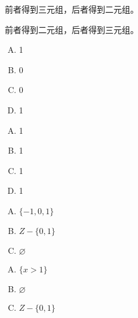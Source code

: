 {{        %
        \begin{practices}
            前者得到三元组，后者得到二元组。
        \end{practices}

        \begin{practices}
            前者得到二元组，后者得到三元组。
        \end{practices}

        \begin{practices}
            \begin{enumerate}[A.]
                \item 1
                \item 0
                \item 0
                \item 1
            \end{enumerate}
        \end{practices}

        \begin{practices}
            \begin{enumerate}[A.]
                \item 1
                \item 1
                \item 1
                \item 1
            \end{enumerate}
        \end{practices}

        \begin{practices}
            \begin{enumerate}[A.]
                \item $\{-1, 0, 1\}$
                \item $Z - \{0, 1\}$
                \item $\varnothing$
            \end{enumerate}
        \end{practices}

        \begin{practices}
            \begin{enumerate}[A.]
                \item $\{x > 1\}$
                \item $\varnothing$
                \item $Z - \{0, 1\}$
            \end{enumerate}
        \end{practices}

}}
